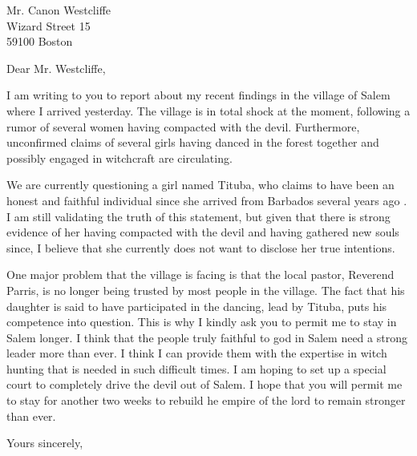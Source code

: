 \documentclass{letter}
\begin{document}
\onehalfspacing
{}\selectfont

\begin{letter}{Mr. Canon Westcliffe \\
Wizard Street 15 \\
59100 Boston}

\opening{Dear Mr. Westcliffe,}

I am writing to you to report about my recent findings in the village of Salem where I arrived yesterday. The village is in total shock at the moment, following a rumor of several women having compacted with the devil. Furthermore, unconfirmed claims of several girls having danced in the forest together and possibly engaged in witchcraft are circulating.

We are currently questioning a girl named Tituba, who claims to have been an honest and faithful individual since she arrived from Barbados several years ago . I am still validating the truth of this statement, but given that there is strong evidence of her having compacted with the devil and having gathered new souls since, I believe that she currently does not want to disclose her true intentions.

One major problem that the village is facing is that the local pastor, Reverend Parris, is no longer being trusted by most people in the village. The fact that his daughter is said to have participated in the dancing, lead by Tituba, puts his competence into question. This is why I kindly ask you to permit me to stay in Salem longer. I think that the people truly faithful to god in Salem need a strong leader more than ever. I think I can provide them with the expertise in witch hunting that is needed in such difficult times. I am hoping to set up a special court to completely drive the devil out of Salem. I hope that you will permit me to stay for another two weeks to rebuild he empire of the lord to remain stronger than ever.

\closing{Yours sincerely,}
\end{letter}
\end{document}
